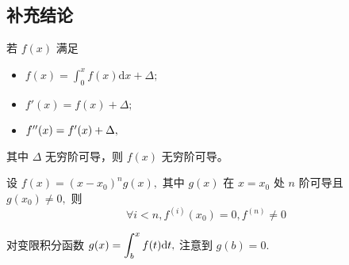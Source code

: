 \begin{Appendices}[附录]

\chapter{补充结论}


若 $ f(x) $ 满足
\begin{itemize}
    \item $ f(x)=\int_0^xf(x)\mathrm{d}x + \Delta; $ 
    \item $ f'(x)=f(x)+\Delta; $ 
    \item $ f^{\prime\prime}(x) = f'(x) + \Delta,$ 
\end{itemize}

其中 $ \Delta $ 无穷阶可导，则 $ f(x) $ 无穷阶可导。


设 $ f(x) = (x - x_0)^ng(x), $ 其中 $ g(x) $ 在 $ x = x_0 $ 处 $ n $ 阶可导且 $ g(x_0) \neq 0, $ 则
$$
    \forall  i < n, f^{(i)}(x_0) = 0, f^{(n)}\neq 0
$$  


对变限积分函数 $ g(x) = \displaystyle \int_b^x f(t)\mathrm{d}t, $ 注意到 $ g(b) = 0. $ 
\end{Appendices}
